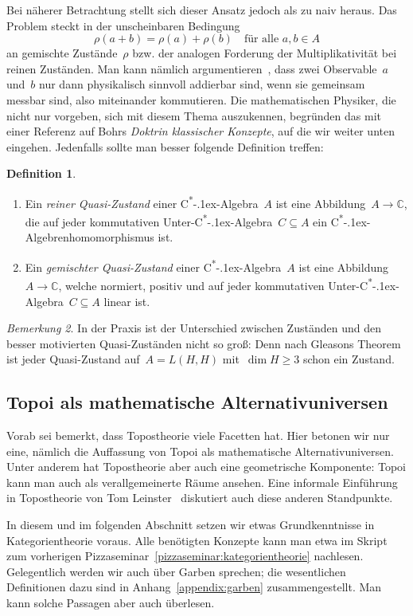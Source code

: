 \documentclass[a4paper,ngerman,12pt]{scrartcl}
\theoremstyle{definition}
\newtheorem{defn}{Definition}[section]
\theoremstyle{plain}
\theoremstyle{remark}
\newtheorem{bem}[defn]{Bemerkung}
\newcommand{\CC}{\mathbb{C}}
\newcommand{\csalgebra}{C\textsuperscript{*}\kern-.1ex-Algebra}
\newcommand{\csalgebren}{C\textsuperscript{*}\kern-.1ex-Alge\-bren}
\renewcommand{\_}{\mathpunct{.}\,}
\newcommand{\?}{\,{:}\,}
\begin{document}
Bei näherer Betrachtung stellt sich dieser Ansatz jedoch als zu naiv heraus. Das
Problem steckt in der unscheinbaren Bedingung
\[ \rho(a + b) = \rho(a) + \rho(b) \quad\text{für alle~$a,b \in A$} \]
an gemischte Zustände~$\rho$ bzw. der analogen Forderung der
Multiplikativität bei reinen Zuständen. Man kann nämlich
argumentieren~\cite[Seite~27]{topos:aqt},
dass zwei Observable~$a$ und~$b$ nur dann physikalisch sinnvoll addierbar sind,
wenn sie gemeinsam messbar sind, also miteinander kommutieren. Die
mathematischen Physiker, die nicht nur vorgeben, sich mit diesem Thema
auszukennen, begründen das mit einer Referenz auf Bohrs \emph{Doktrin
klassischer Konzepte}, auf die wir weiter unten eingehen. Jedenfalls sollte man
besser folgende Definition treffen:

\begin{defn}\begin{enumerate}
\item
Ein \emph{reiner Quasi-Zustand} einer \csalgebra~$A$ ist eine Abbildung~$A \to \CC$,
die auf jeder kommutativen Unter-\csalgebra~$C \subseteq A$ ein
\csalgebren\-homo\-mor\-phis\-mus ist.
\item Ein \emph{gemischter Quasi-Zustand} einer \csalgebra~$A$ ist eine Abbildung~$A
\to \CC$, welche normiert, positiv und auf jeder kommutativen
Unter-\csalgebra~$C \subseteq A$ linear ist.
\end{enumerate}
\end{defn}

\begin{bem}In der Praxis ist der Unterschied zwischen Zuständen und den besser
motivierten Quasi-Zuständen nicht so groß: Denn nach Gleasons Theorem ist jeder
Quasi-Zustand auf~$A = L(H,H)$ mit~$\dim H \geq 3$ schon ein Zustand.\end{bem}


\subsection{Topoi als mathematische Alternativuniversen}

Vorab sei bemerkt, dass Topostheorie viele Facetten hat. Hier betonen wir nur eine, nämlich
die Auffassung von Topoi als mathematische Alternativuniversen. Unter anderem
hat Topostheorie aber auch eine geometrische Komponente: Topoi kann man auch als
verallgemeinerte Räume ansehen. Eine informale Einführung in Topostheorie
von Tom Leinster~\cite{leinster:topos} diskutiert auch diese anderen
Standpunkte.

In diesem und im folgenden Abschnitt setzen wir etwas Grundkenntnisse in
Kategorientheorie voraus. Alle benötigten Konzepte kann man etwa im
Skript zum vorherigen Pizzaseminar~\ref{pizzaseminar:kategorientheorie}
nachlesen. Gelegentlich werden wir auch über Garben sprechen; die wesentlichen
Definitionen dazu sind in Anhang~\ref{appendix:garben} zusammengestellt. Man
kann solche Passagen aber auch überlesen.
\end{document}
